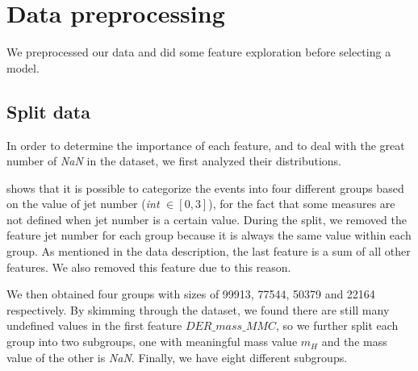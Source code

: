 \documentclass[10pt,conference,compsocconf]{IEEEtran}
\begin{document}
\section{Data preprocessing}

We preprocessed our data and did some feature exploration before selecting a model.

\subsection{Split data}
In order to determine the importance of each feature, and to deal with the great number of \emph{NaN} in the dataset, we first analyzed their distributions. 

\cite{higgsChallenge} shows that it is possible to categorize the events into four different groups based on the value of jet number (\emph{int} $\in [0, 3]$), for the fact that some measures are not defined when jet number is a certain value. During the split, we removed the feature jet number for each group because it is always the same value within each group. As mentioned in the data description, the last feature is a sum of all other features. We also removed this feature due to this reason. 

We then obtained four groups with sizes of 99913, 77544, 50379 and 22164 respectively. By skimming through the dataset, we found there are still many undefined values in the first feature $DER\_mass\_MMC$, so we further split each group into two subgroups, one with meaningful mass value $m_H$ and the mass value of the other is \emph{NaN}. Finally, we have eight different subgroups.%
\end{document}

